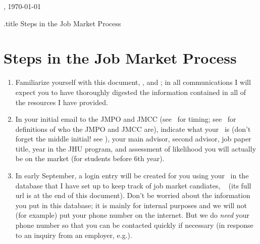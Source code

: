 \documentclass{\classes/econtex}
\begin{document}
\hfill{\tiny \jobname, \today} \vspace{0.1in}

\begin{verbatimwrite}{\jobname.title}
  Steps in the Job Market Process
\end{verbatimwrite}

\section*{\Large Steps in the Job Market Process}\medskip\medskip

\begin{enumerate}
\item Familiarize yourself with this document, \timet, and \faq; in all communications I will expect you
  to have thoroughly digested the information contained in all of the resources
  I have provided.

\item In your initial email to the JMPO and JMCC (see
  \timet~for timing; see \ntn~for definitions of who the JMPO and JMCC are), indicate what your \Moniker~is (don't forget the middle initial!  see \Notation), your main advisor, second advisor, job paper title,
  year in the JHU program, and assessment of likelihood you will
  actually be on the market (for students before 6th year).

  \hypertarget{jhueconpeople-data}{}
\item {} In early September, a login entry will be created for you using your \Moniker~in the database that I have set up to keep track of job market candiates, \db~ (its full url is at the end of this document).  Don't be worried about the information you put in this database; it is mainly for internal purposes and we will not (for example) put your phone number on the internet.  But we do \textit{need} your phone number so that you can be contacted quickly if necessary (in response to an inquiry from an employer, e.g.).


\end{enumerate}
\end{document}
